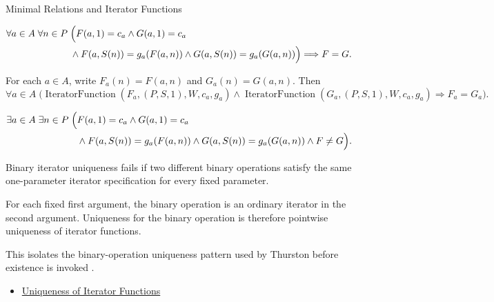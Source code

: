 \begin{topicbox}{Minimal Relations and Iterator Functions}
\begin{remark*}
\[
\begin{aligned}
\forall a\in A\;\forall n\in P\;&\Bigl(
F(a,1)=c_a\land G(a,1)=c_a\\
&\land F(a,S(n))=g_a(F(a,n))
\land G(a,S(n))=g_a(G(a,n))\Bigr)
\Longrightarrow F=G.
\end{aligned}
\]
\end{remark*}

\begin{remark*}
For each $a\in A$, write $F_a(n)=F(a,n)$ and $G_a(n)=G(a,n)$. Then
\[
\forall a\in A\;
\bigl(\operatorname{IteratorFunction}(F_a,(P,S,1),W,c_a,g_a)
\land \operatorname{IteratorFunction}(G_a,(P,S,1),W,c_a,g_a)
\Longrightarrow F_a=G_a\bigr).
\]
\end{remark*}

\begin{remark*}
\[
\begin{aligned}
\exists a\in A\;\exists n\in P\;\Bigl(&
F(a,1)=c_a\land G(a,1)=c_a\\
&\land F(a,S(n))=g_a(F(a,n))
\land G(a,S(n))=g_a(G(a,n))
\land F\neq G\Bigr).
\end{aligned}
\]
\end{remark*}

\begin{remark*}
Binary iterator uniqueness fails if two different binary operations satisfy
the same one-parameter iterator specification for every fixed parameter.
\end{remark*}

\begin{remark*}[Interpretation]
For each fixed first argument, the binary operation is an ordinary iterator in
the second argument. Uniqueness for the binary operation is therefore
pointwise uniqueness of iterator functions.
\end{remark*}

\begin{remark*}
This isolates the binary-operation uniqueness pattern used by Thurston before
existence is invoked \citep{thurston1956numbersystem}.
\end{remark*}

\begin{dependencies}
\begin{itemize}
  \item \hyperref[lem:uniqueness-of-iterator-functions]{Uniqueness of Iterator Functions}
\end{itemize}
\end{dependencies}
\end{topicbox}

